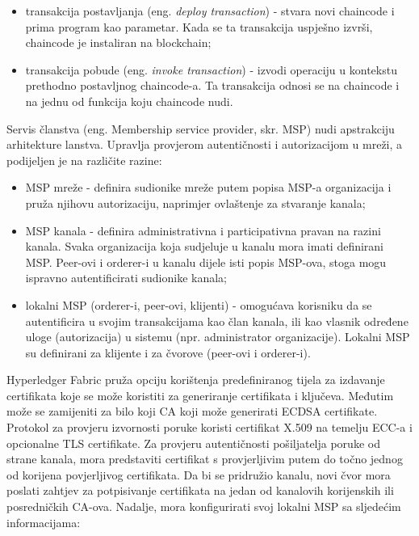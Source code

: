 \documentclass[times, utf8, diplomski]{fer}
\begin{document}
\begin{itemize}

\item transakcija postavljanja (eng. \textit{deploy transaction}) - stvara novi chaincode i prima program kao parametar. Kada se ta transakcija uspješno izvrši, chaincode je instaliran na blockchain;

\item transakcija pobude (eng. \textit{invoke transaction}) - izvodi operaciju u kontekstu prethodno postavljnog chaincode-a. Ta transakcija odnosi se na chaincode i na jednu od funkcija koju chaincode nudi.

\end{itemize}

Servis članstva (eng. Membership service provider, skr. MSP) nudi apstrakciju arhitekture lanstva. Upravlja provjerom autentičnosti i autorizacijom u mreži, a podijeljen je na različite razine:

\begin{itemize}

\item MSP mreže - definira sudionike mreže putem popisa MSP-a organizacija i pruža njihovu autorizaciju, naprimjer ovlaštenje za stvaranje kanala;

\item MSP kanala - definira administrativna i participativna pravan na razini kanala. Svaka organizacija koja sudjeluje u kanalu mora imati definirani MSP. Peer-ovi i orderer-i u kanalu dijele isti popis MSP-ova, stoga mogu ispravno autentificirati sudionike kanala;

\item lokalni MSP (orderer-i, peer-ovi, klijenti) - omogućava korisniku da se autentificira u svojim transakcijama kao član kanala, ili kao vlasnik određene uloge (autorizacija) u sistemu (npr. administrator organizacije). Lokalni MSP su definirani za klijente i za čvorove (peer-ovi i orderer-i).

\end{itemize}

Hyperledger Fabric pruža opciju korištenja predefiniranog tijela za izdavanje certifikata koje se može koristiti za generiranje certifikata i ključeva. Međutim može se zamijeniti za bilo koji CA koji može generirati ECDSA certifikate. Protokol za provjeru izvornosti poruke koristi certifikat X.509 na temelju ECC-a \cite{lagarde2019security} i opcionalne TLS certifikate. Za provjeru autentičnosti pošiljatelja poruke od strane kanala, mora predstaviti certifikat s provjerljivim putem do točno jednog od korijena povjerljivog certifikata.  Da bi se pridružio kanalu, novi čvor mora poslati zahtjev za potpisivanje certifikata na jedan od kanalovih korijenskih ili posredničkih CA-ova. Nadalje, mora konfigurirati svoj lokalni MSP sa sljedećim informacijama:
\end{document}
